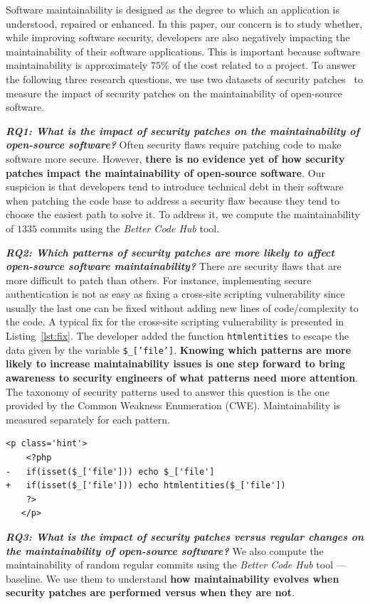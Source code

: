 \documentclass[10pt,conference]{IEEEtran}
\newcounter{lstannotation}
\begin{document}
Software maintainability is designed as the degree to which an application is understood, 
repaired or enhanced. In this paper, our concern is to study whether, while improving software
security, developers are also negatively impacting the maintainability of their
software applications. This is important because software maintainability is 
approximately $75\%$ of the cost related to a project. To answer the following three 
research questions, we use two datasets of security patches~\cite{Reis:2017:IJSSE, 10.1109/MSR.2019.00064} 
to measure the impact of security patches on the maintainability of open-source software. 
%

\textit{\textbf{RQ1: What is the impact of security patches on the
maintainability of open-source software?}} Often security flaws require patching 
code to make software more secure.
However, \textbf{there is no evidence yet of how security patches impact the
maintainability of open-source software}. Our suspicion is that developers tend
to introduce technical debt in their software when patching the code base to
address a security flaw because they tend to choose the easiest path to solve
it. To address it, we compute the maintainability of $1335$ commits using the
\emph{Better Code Hub} tool. 
%

\textit{\textbf{RQ2: Which patterns of security patches are more likely to
affect open-source software maintainability?}}
There are security flaws that are more difficult to patch than others. For
instance, implementing secure authentication is not as easy as fixing a
cross-site scripting vulnerability since usually the last one can be fixed
without adding new lines of code/complexity to the code. A typical fix for 
the cross-site scripting vulnerability is presented in Listing~\ref{lst:fix}. 
The developer added the function \texttt{htmlentities} to escape the data given by the variable
\texttt{\$\_['file']}. \textbf{Knowing which patterns are more likely to increase
maintainability issues is one step forward to bring awareness to security
engineers of what patterns need more attention}. The taxonomy of security
patterns used to answer this question is the one provided by the Common Weakness Enumeration
(CWE). Maintainability is measured
separately for each pattern.
%
\setcounter{lstannotation}{0}
\begin{lstlisting}[style={PHPStyle}, caption={Fix provided by \texttt{nextcloud/server} developers to a \\Cross-Site Scripting vulnerability},label={lst:fix}]
   <p class='hint'>
    <?php
-   if(isset($_['file'])) echo $_['file']
+   if(isset($_['file'])) echo htmlentities($_['file'])
    ?>
   </p>
\end{lstlisting}
%
\textit{\textbf{RQ3: What is the impact of security patches versus regular changes on the
maintainability of open-source software?}}
%
We also compute the maintainability of random regular commits using the
\emph{Better Code Hub} tool --- baseline.  We use them to understand \textbf{how
maintainability evolves when security patches are performed versus when
they are not}.
%
\end{document}
